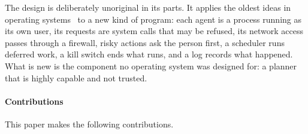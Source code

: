 The design is deliberately unoriginal in its parts. It applies the
oldest ideas in operating systems~\cite{saltzer1975protection,
anderson1972planning} to a new kind of program: each agent is a
process running as its own user, its requests are system calls that
may be refused, its network access passes through a firewall, risky
actions ask the person first, a scheduler runs deferred work, a kill
switch ends what runs, and a log records what happened. What is new is
the component no operating system was designed for: a planner that is
highly capable and not trusted.

\paragraph{Contributions}
This paper makes the following contributions.

